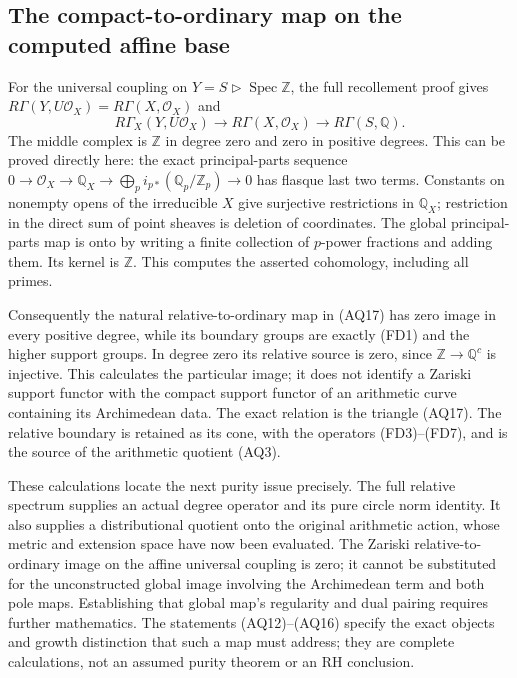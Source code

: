 \documentclass[11pt,a4paper]{article}
\theoremstyle{definition}\newtheorem{definition}[theorem]{Definition}
\begin{document}
\subsection{The compact-to-ordinary map on the computed affine base}
For the universal coupling on $Y=S\triangleright\operatorname{Spec}\mathbb Z$,
the full recollement proof gives
$R\Gamma(Y,U\mathcal O_X)=R\Gamma(X,\mathcal O_X)$ and
\[
 R\Gamma_X(Y,U\mathcal O_X)
 \longrightarrow R\Gamma(X,\mathcal O_X)
 \longrightarrow R\Gamma(S,\mathbb Q).
 \tag{AQ17}
\]
The middle complex is $\mathbb Z$ in degree zero and zero in positive
degrees. This can be proved directly here: the exact principal-parts
sequence $0\to\mathcal O_X\to\mathbb Q_X\to
\bigoplus_p i_{p*}(\mathbb Q_p/\mathbb Z_p)\to0$ has flasque
last two terms. Constants on nonempty opens of the irreducible $X$
give surjective restrictions in $\mathbb Q_X$; restriction in the
direct sum of point sheaves is deletion of coordinates. The global
principal-parts map is onto by writing a finite collection of
$p$-power fractions and adding them. Its kernel is $\mathbb Z$.
This computes the asserted cohomology, including all primes.

Consequently the natural relative-to-ordinary map in (AQ17) has
zero image in every positive degree, while its boundary groups are
exactly (FD1) and the higher support groups. In degree zero its
relative source is zero, since $\mathbb Z\to\mathbb Q^c$ is injective.
This calculates the particular image; it does not identify a
Zariski support functor with the compact support functor of an
arithmetic curve containing its Archimedean data. The exact
relation is the triangle (AQ17). The relative boundary is retained
as its cone, with the operators (FD3)--(FD7), and is the source
of the arithmetic quotient (AQ3).

These calculations locate the next purity issue precisely. The full
relative spectrum supplies an actual degree operator and its pure
circle norm identity. It also supplies a distributional quotient onto
the original arithmetic action, whose metric and extension space have
now been evaluated. The Zariski relative-to-ordinary image on the
affine universal coupling is zero; it cannot be substituted for the
unconstructed global image involving the Archimedean term and both
pole maps. Establishing that global map's regularity and dual pairing
requires further mathematics. The statements (AQ12)--(AQ16) specify
the exact objects and growth distinction that such a map must address;
they are complete calculations, not an assumed purity theorem or an RH
conclusion.
\end{document}
